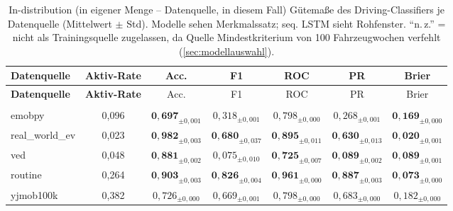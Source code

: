 \clearpage
\begin{landscape}
\pagestyle{empty}%
%
\begin{small}
\begin{longtable}{lcccccc}
\caption{In-distribution (in eigener Menge -- Datenquelle, in diesem Fall) Gütemaße des Driving-Classifiers je Datenquelle (Mittelwert $\pm$ Std). Modelle sehen Merkmalssatz; seq. LSTM sieht Rohfenster. \enquote{n.\,z.} = nicht als Trainingsquelle zugelassen, da Quelle Mindestkriterium von 100 Fahrzeugwochen verfehlt (\cref*{sec:modellauswahl}).}
\label{tab:cv_metrics}\\
\toprule
\textbf{Datenquelle} & \textbf{Aktiv-Rate} & Acc. & F1 & ROC & PR & Brier \\
\midrule
\endfirsthead
\toprule
\textbf{Datenquelle} & \textbf{Aktiv-Rate} & Acc. & F1 & ROC & PR & Brier \\
\midrule
\endhead
\midrule
\endfoot
\bottomrule
\endlastfoot
\multicolumn{7}{l}{\textbf{RandomForest}}\\
\midrule
emobpy          & 0,096 & $\mathbf{0{,}697}_{\pm0{,}001}$ & $0{,}318_{\pm0{,}001}$ & $0{,}798_{\pm0{,}000}$ & $0{,}268_{\pm0{,}001}$ & $\mathbf{0{,}169}_{\pm0{,}000}$ \\
real\_world\_ev & 0,023 & $\mathbf{0{,}982}_{\pm0{,}003}$ & $\mathbf{0{,}680}_{\pm0{,}037}$ & $\mathbf{0{,}895}_{\pm0{,}011}$ & $\mathbf{0{,}630}_{\pm0{,}013}$ & $\mathbf{0{,}020}_{\pm0{,}001}$ \\
ved             & 0,048 & $\mathbf{0{,}881}_{\pm0{,}002}$ & $0{,}075_{\pm0{,}010}$ & $\mathbf{0{,}725}_{\pm0{,}007}$ & $\mathbf{0{,}089}_{\pm0{,}002}$ & $\mathbf{0{,}089}_{\pm0{,}001}$ \\
routine         & 0,264 & $\mathbf{0{,}903}_{\pm0{,}003}$ & $\mathbf{0{,}826}_{\pm0{,}004}$ & $\mathbf{0{,}961}_{\pm0{,}000}$ & $\mathbf{0{,}887}_{\pm0{,}003}$ & $\mathbf{0{,}073}_{\pm0{,}000}$ \\
yjmob100k       & 0,382 & $0{,}726_{\pm0{,}000}$ & $0{,}669_{\pm0{,}001}$ & $0{,}798_{\pm0{,}000}$ & $0{,}683_{\pm0{,}000}$ & $0{,}182_{\pm0{,}000}$ \\

\end{longtable}
\end{small}
\end{landscape}
